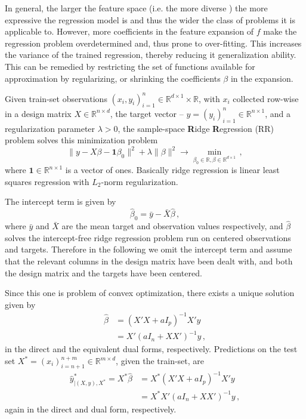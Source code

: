 \documentclass{ITaSconf}
\newcommand{\Real}{\mathbb{R}}
\newcommand{\one}{\mathbf{1}}
\begin{document}
In general, the larger the feature space (i.e. the more diverse ) the more expressive
the regression model is and thus the wider the class of problems it is applicable
to. However, more coefficients in the feature expansion of $f$ make the regression
problem overdetermined and, thus prone to over-fitting. This increases the variance
of the trained regression, thereby reducing it generalization ability. This can be
remedied by restricting the set of functions available for approximation by regularizing,
or shrinking the coefficients $\beta$ in the expansion.

Given train-set observations $(x_i, y_i)_{i=1}^n \in \Real^{d\times 1}\times \Real$,
with $x_i$ collected row-wise in a design matrix $X\in \Real^{n\times d}$, the target
vector -- $y=(y_i)_{i=1}^n \in \Real^{n\times 1}$, and a regularization parameter
$\lambda > 0$, the sample-space \textbf{R}idge \textbf{R}egression (RR) problem solves
this minimization problem
\begin{equation}
  \| y - X\beta - \one\beta_0 \|^2 + \lambda \|\beta\|^2
    \to \min_{\beta_0\in \Real, \beta \in \Real^{d\times 1}} \,,
\end{equation}
where $\one \in \Real^{n\times 1}$ is a vector of ones. Basically ridge regression
is linear least squares regression with $L_2$-norm regularization.

The intercept term is given by
\begin{equation}
  \hat{\beta}_0 = \bar{y} - \bar{X} \hat{\beta} \,,
\end{equation}
where $\bar{y}$ and $\bar{X}$ are the mean target and observation values respectively,
and $\hat{\beta}$ solves the intercept-free ridge regression problem run on centered
observations and targets. Therefore in the following we omit the intercept term and
assume that the relevant columns in the design matrix have been dealt with, and both
the design matrix and the targets have been centered.

Since this one is problem of convex optimization, there exists a unique solution
given by 
\begin{align*}
  \hat{\beta}
    &= (X'X + a I_p)^{-1} X' y \\
    &= X' (a I_n + XX')^{-1} y \,,
\end{align*}
in the direct and the equivalent dual forms, respectively. Predictions on the test
set $X^* = (x_i)_{i=n+1}^{n+m}\in \Real^{m\times d}$, given the train-set, are
\begin{align}
  \hat{y}^*_{\vert(X,y), X^*} = X^* \hat{\beta}
    &= X^* (X'X + a I_p)^{-1} X' y \nonumber \\ 
    &= X^* X' (a I_n + XX')^{-1} y \label{eq:rr_dual_sol}\,,
\end{align}
again in the direct and dual form, respectively.
\end{document}
